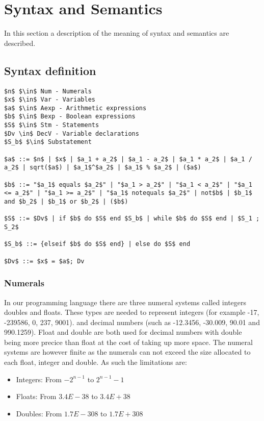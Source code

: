 \chapter{Syntax and Semantics}\label{analysis:syntax-and-semantics}
In this section a description of the meaning of syntax and semantics are described.

\section{Syntax definition}\label{sec:anlysis:syntax-definition}
\begin{lstlisting}[mathescape, captionpos=b, caption={Syntax formation rules}, label={lst:syntax-formation}]
$n$ $\in$ Num - Numerals
$x$ $\in$ Var - Variables
$a$ $\in$ Aexp - Arithmetic expressions
$b$ $\in$ Bexp - Boolean expressions
$S$ $\in$ Stm - Statements
$Dv \in$ DecV - Variable declarations
$S_b$ $\in$ Substatement

$a$ ::= $n$ | $x$ | $a_1 + a_2$ | $a_1 - a_2$ | $a_1 * a_2$ | $a_1 / a_2$ | sqrt($a$) | $a_1$^$a_2$ | $a_1$ % $a_2$ | ($a$)

$b$ ::= "$a_1$ equals $a_2$" | "$a_1 > a_2$" | "$a_1 < a_2$" | "$a_1 <= a_2$" | "$a_1 >= a_2$" | "$a_1$ notequals $a_2$" | not$b$ | $b_1$ and $b_2$ | $b_1$ or $b_2$ | ($b$)

$S$ ::= $Dv$ | if $b$ do $S$ end $S_b$ | while $b$ do $S$ end | $S_1 ; S_2$

$S_b$ ::= {elseif $b$ do $S$ end} | else do $S$ end

$Dv$ ::= $x$ = $a$; Dv
\end{lstlisting}

\subsection{Numerals}
In our programming language there are three numeral systems called integers doubles and floats. These types are needed to represent integers (for example -17, -239586, 0, 237, 9001). and decimal numbers (such as -12.3456, -30.009, 90.01 and 990.1259). Float and double are both used for decimal numbers with double being more precice than float at the cost of taking up more space. The numeral systems are however finite as the numerals can not exceed the size allocated to each float, integer and double. As such the limitations are:
\begin{itemize}
\item Integers: From $-2^{n-1}$ to $2^{n-1}-1$
\item Floats: From $3.4E-38$ to $3.4E+38$
\item Doubles: From $1.7E-308$ to $1.7E+308$
\end{itemize}

